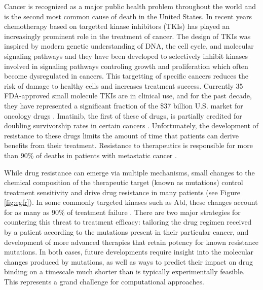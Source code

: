 Cancer is recognized as a major public health problem throughout the world and is the second most common cause of death in the United States. \cite{Siegel2016}
In recent years chemotherapy based on targetted kinase inhibitors (TKIs) has played an increasingly prominent role in the treatment of cancer.
The design of TKIs was inspired by modern genetic understanding of DNA, the cell cycle, and molecular signaling pathways and they have been developed to selectively inhibit kinases involved in signaling pathways 
controling growth and proliferation which often become dysregulated in cancers.
This targetting of specific cancers reduces the risk of damage to healthy cells and increases treatment success.
Currently 35 FDA-approved small molecule TKIs are in clinical use, and for the past decade, they have represented a significant fraction of the \$37 billion U.S. market for oncology drugs \cite{FDA, Zhao2014}.
Imatinib, the first of these of drugs, is partially credited for doubling survivorship rates in certain cancers \cite{Zhao2014, ACSreport}.
Unfortunately, the development of resistance to these drugs limits the amount of time that patients can derive benefits from their treatment. 
Resistance to therapeutics is responsible for more than 90\% of deaths in patients with metastatic cancer \cite{Longley2005}.

While drug resistance can emerge via multiple mechanisms, small changes to the chemical composition of the therapeutic target (known as mutations) control treatment sensitivity and drive drug resistance in many patients (see Figure \ref{fig:egfr}).
In some commonly targeted kinases such as Abl, these changes account for as many as 90\% of treatment failure \cite{Shah2002}.
There are two major strategies for countering this threat to treatment efficacy: tailoring the drug regimen received by a patient according to the mutations present in their particular cancer, and development of more advanced %
therapies that retain potency for known resistance mutations.
In both cases, future developments require insight into the molecular changes produced by mutations, as well as ways to predict their impact on drug binding on a timescale much shorter than is typically experimentally feasible.
This represents a grand challenge for computational approaches.

